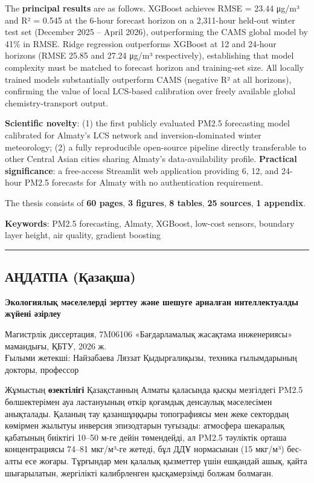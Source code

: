 The \textbf{principal results} are as follows. XGBoost achieves RMSE = 23.44 μg/m³ and R² = 0.545 at the 6-hour forecast horizon on a 2,311-hour held-out winter test set (December 2025 -- April 2026), outperforming the CAMS global model by 41\% in RMSE. Ridge regression outperforms XGBoost at 12 and 24-hour horizons (RMSE 25.85 and 27.24 μg/m³ respectively), establishing that model complexity must be matched to forecast horizon and training-set size. All locally trained models substantially outperform CAMS (negative R² at all horizons), confirming the value of local LCS-based calibration over freely available global chemistry-transport output.

\textbf{Scientific novelty}: (1) the first publicly evaluated PM2.5 forecasting model calibrated for Almaty's LCS network and inversion-dominated winter meteorology; (2) a fully reproducible open-source pipeline directly transferable to other Central Asian cities sharing Almaty's data-availability profile. \textbf{Practical significance}: a free-access Streamlit web application providing 6, 12, and 24-hour PM2.5 forecasts for Almaty with no authentication requirement.

The thesis consists of \textbf{60 pages}, \textbf{3 figures}, \textbf{8 tables}, \textbf{25 sources}, \textbf{1 appendix}.

\textbf{Keywords}: PM2.5 forecasting, Almaty, XGBoost, low-cost sensors, boundary layer height, air quality, gradient boosting

\begin{center}\rule{0.5\linewidth}{0.5pt}\end{center}

\subsection{АҢДАТПА (Қазақша)}\label{ux430ux4a3ux434ux430ux442ux43fux430-ux49bux430ux437ux430ux49bux448ux430}

\textbf{Экологиялық мәселелерді зерттеу және шешуге арналған интеллектуалды жүйені әзірлеу}

Магистрлік диссертация, 7M06106 «Бағдарламалық жасақтама инженериясы» мамандығы, ҚБТУ, 2026 ж.\\
Ғылыми жетекші: Найзабаева Ляззат Қыдырғалиқызы, техника ғылымдарының докторы, профессор

Жұмыстың \textbf{өзектілігі} Қазақстанның Алматы қаласында қысқы мезгілдегі PM2.5 бөлшектерімен ауа ластануының өткір қоғамдық денсаулық мәселесімен анықталады. Қаланың тау қазаншұңқыры топографиясы мен жеке сектордың көмірмен жылытуы инверсия эпизодтарын туғызады: атмосфера шекаралық қабатының биіктігі 10--50 м-ге дейін төмендейді, ал PM2.5 тәуліктік орташа концентрациясы 74--81 мкг/м³-ге жетеді, бұл ДДҰ нормасынан (15 мкг/м³) бес-алты есе жоғары. Тұрғындар мен қалалық қызметтер үшін ешқандай ашық, қайта шығарылатын, жергілікті калибрленген қысқамерзімді болжам болмаған.

